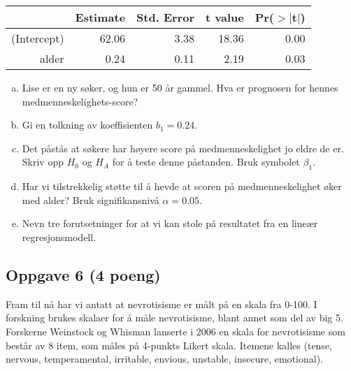 \documentclass[12pt,a4paper, norsk]{article}
\begin{document}
			\begin{center}
		
	\begin{tabular}{rrrrr}
  \hline
 & Estimate & Std. Error & t value & Pr($>$$|$t$|$) \\ 
  \hline
(Intercept) & 62.06 & 3.38 & 18.36 & 0.00 \\ 
  alder & 0.24 & 0.11 & 2.19 & 0.03 \\ 
   \hline
\end{tabular}
			 	\end{center}
			
			
			 \begin{enumerate}[(a)]
			
			\item  Lise er en ny søker, og hun er 50 år gammel. Hva er prognosen for hennes medmenneskelighets-score? 
			
			\item  Gi en tolkning av koeffisienten $b_1=0.24$.
			
			\item 
			 Det påstås  at søkere har høyere score på medmenneskelighet jo eldre de er. Skriv opp $H_0$ og $H_A$ for å teste denne påstanden. Bruk symbolet $\beta_1$. 
			 
			 \item Har vi tilstrekkelig støtte til å hevde at scoren på medmenneskelighet øker med alder? Bruk signifikansnivå $\alpha=0.05$. 
			
			\item Nevn tre forutsetninger for at vi kan stole på resultatet fra en lineær regresjonsmodell.
			
			
			
				\end{enumerate}		
				
	
	\subsection*{Oppgave 6  (4 poeng) }
	
	Fram til nå har vi antatt at nevrotisisme er målt på  en skala fra 0-100. I forskning brukes skalaer for å måle nevrotisisme, blant annet som del av big 5. Forskerne Weinstock og Whisman lanserte i 2006 en skala for nevrotisisme som består av 8 item, som måles på 4-punkts  Likert skala.
	Itemene kalles (tense, nervous, temperamental, irritable, envious, unstable, insecure, emotional). 
	
	 
	
\end{document}
